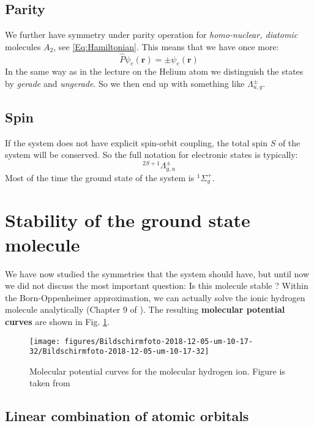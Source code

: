\documentclass[10pt]{article}
\let\cite\citep
\providecommand\citep{\cite}
\begin{document}
\subsection{Parity}
We further have symmetry under parity operation for \textit{homo-nuclear, diatomic} molecules $A_2$, see \eqref{Eq:Hamiltonian}. This means that we have once more:
\begin{equation}
\hat{P}\psi_e(\mathbf{r}) = \pm\psi_e(\mathbf{r})
\end{equation}
In the same way as in the lecture on the Helium atom we distinguish the states by \textit{gerade} and \textit{ungerade}. So we then end up with something like $\Lambda_{u,g}^\pm$.

\subsection{Spin}

If the system does not have explicit spin-orbit coupling, the total spin $S$ of the system will be conserved. So the full notation for electronic states is typically:
\begin{equation}
 ^{2S+1}\Lambda^{\pm}_{g,u}
\end{equation}
Most of the time the ground state of the system is $^{1}\Sigma^{+}_{g}$.



\section{Stability of the ground state molecule}

We have now studied the symmetries that the system should have, but until now we did not discuss the most important question: Is this molecule stable ? Within the Born-Oppenheimer approximation, we can actually solve the ionic hydrogen molecule analytically (Chapter 9 of \cite{Demtr_der_2010}). The resulting \textbf{molecular potential curves} are shown in Fig. \ref{632456}.
\begin{figure}[h!]
\begin{center}
\texttt{[image: figures/Bildschirmfoto-2018-12-05-um-10-17-32/Bildschirmfoto-2018-12-05-um-10-17-32]}
\caption{{Molecular potential curves for the molecular hydrogen ion. Figure is
taken from \protect\cite{mechanics}
{\label{632456}}%
}}
\end{center}
\end{figure}

\subsection{Linear combination of atomic orbitals}
\end{document}
